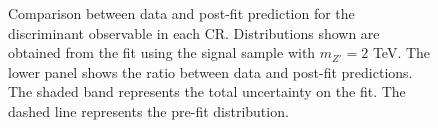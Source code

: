 \documentclass[../thesis.tex]{subfiles}
\begin{document}
\begin{figure}[!htbp]
\caption{\label{fig:results:bg_postfit}Comparison between data and post-fit prediction for the discriminant observable in each \acs{CR}. Distributions shown are obtained from the fit using the \ttZp signal sample with $m_{Z'}=2$ TeV. The lower panel shows the ratio between data and post-fit predictions. The shaded band represents the total uncertainty on the fit. The dashed line represents the pre-fit distribution.}
\end{figure}
\end{document}
